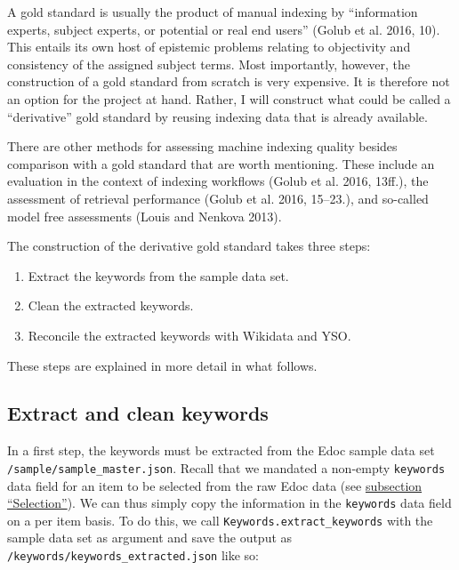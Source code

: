 A gold standard is usually the product of manual indexing by
``information experts, subject experts, or potential or real end users''
(Golub et al. 2016, 10). This entails its own host of epistemic problems
relating to objectivity and consistency of the assigned subject terms.
Most importantly, however, the construction of a gold standard from
scratch is very expensive. It is therefore not an option for the project
at hand. Rather, I will construct what could be called a ``derivative''
gold standard by reusing indexing data that is already available.

There are other methods for assessing machine indexing quality besides
comparison with a gold standard that are worth mentioning. These include
an evaluation in the context of indexing workflows (Golub et al. 2016,
13ff.), the assessment of retrieval performance (Golub et al. 2016,
15--23.), and so-called model free assessments (Louis and Nenkova 2013).

The construction of the derivative gold standard takes three steps:

\begin{enumerate}
\def\labelenumi{\arabic{enumi}.}
\tightlist
\item
  Extract the keywords from the sample data set.
\item
  Clean the extracted keywords.
\item
  Reconcile the extracted keywords with Wikidata and YSO.
\end{enumerate}

These steps are explained in more detail in what follows.

\hypertarget{extract-and-clean-keywords}{%
\subsection{Extract and clean
keywords}\label{extract-and-clean-keywords}}

In a first step, the keywords must be extracted from the Edoc sample
data set \texttt{/sample/sample\_master.json}. Recall that we mandated a
non-empty \texttt{keywords} data field for an item to be selected from
the raw Edoc data (see \protect\hyperlink{selection}{subsection
``Selection''}). We can thus simply copy the information in the
\texttt{keywords} data field on a per item basis. To do this, we call
\texttt{Keywords.extract\_keywords} with the sample data set as argument
and save the output as \texttt{/keywords/keywords\_extracted.json} like
so:

\begin{Shaded}
\begin{Highlighting}[]
\OperatorTok{=}\NormalTok{)}
\NormalTok{)}
\end{Highlighting}
\end{Shaded}

